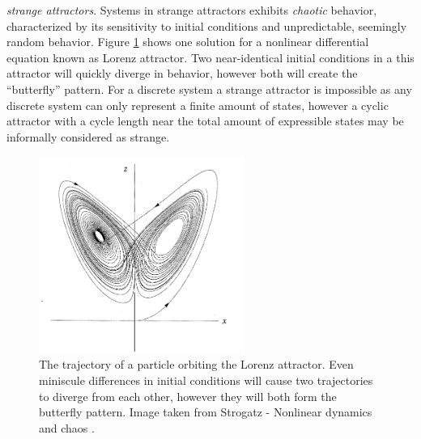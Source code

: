 \emph{strange attractors}.
Systems in strange attractors exhibits \emph{chaotic} behavior, characterized by
its sensitivity to initial conditions and unpredictable, seemingly random
behavior.
Figure \ref{figStrange} shows one solution for a nonlinear differential equation known
as Lorenz attractor.
Two near-identical initial conditions in a this attractor will quickly diverge in
behavior, however both will create the ``butterfly'' pattern.
For a discrete system a strange attractor is impossible as any discrete system
can only represent a finite amount of states, however a cyclic attractor with a
cycle length near the total amount of expressible states may be informally
considered as strange.
% 
\begin{figure}[h!]
  \centering
  \includegraphics[width=0.6\textwidth]{fig/strange.png}
  \caption{
    The trajectory of a particle orbiting the Lorenz attractor.
    Even miniscule differences in initial conditions will cause two trajectories
    to diverge from each other, however they will both form the butterfly
    pattern.
    Image taken from Strogatz - Nonlinear dynamics and chaos \cite{strogatz2014}.
  }
  \label{figStrange}
\end{figure}
%
